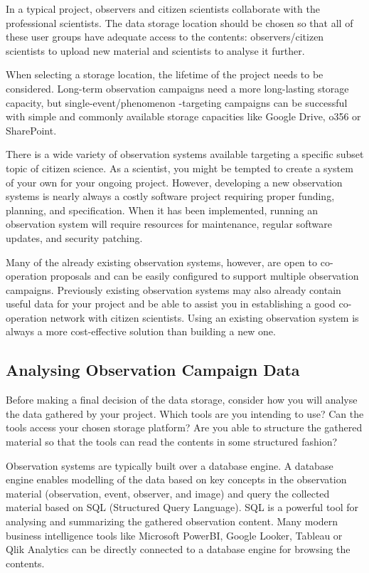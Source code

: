 \documentclass{article}
\newcommand{\contributed}[1]{%
    \par\noindent
    \begingroup
    \setlength{\leftskip}{1em}%
    \itshape
    Contributors: #1
    \par
    \endgroup
    \vspace{0.5em}
}
\begin{document}
In a typical project, observers and citizen scientists collaborate with the professional scientists. The data storage location should be chosen so that all of these user groups have adequate access to the contents: observers/citizen scientists to upload new material and scientists to analyse it further.

When selecting a storage location, the lifetime of the project needs to be considered. Long-term observation campaigns need a more long-lasting storage capacity, but single-event/phenomenon -targeting campaigns can be successful with simple and commonly available storage capacities like Google Drive, o356 or SharePoint.

There is a wide variety of observation systems available targeting a specific subset topic of citizen science. As a scientist, you might be tempted to create a system of your own for your ongoing project. However, developing a new observation systems is nearly always a costly software project requiring proper funding, planning, and specification. When it has been implemented, running an observation system will require resources for maintenance, regular software updates, and security patching. 

Many of the already existing observation systems, however, are open to co-operation proposals and can be easily configured to support multiple observation campaigns. Previously existing observation systems may also already contain useful data for your project and be able to assist you in establishing a good co-operation network with citizen scientists. Using an existing observation system is always a more cost-effective solution than building a new one. 

\subsection{Analysing Observation Campaign Data}\label{sed:data_storage}
Before making a final decision of the data storage, consider how you will analyse the data gathered by your project. Which tools are you intending to use? Can the tools access your chosen storage platform? Are you able to structure the gathered material so that the tools can read the contents in some structured fashion?

Observation systems are typically built over a database engine. A database engine enables modelling of the data based on key concepts in the observation material (observation, event, observer, and image) and query the collected material based on SQL (Structured Query Language). SQL is a powerful tool for analysing and summarizing the gathered observation content. Many modern business intelligence tools like Microsoft PowerBI, Google Looker, Tableau or Qlik Analytics can be directly connected to a database engine for browsing the contents. 
\end{document}
